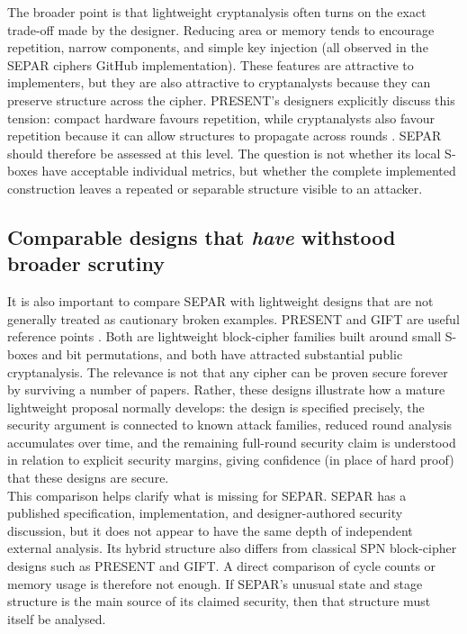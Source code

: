 \documentclass[11pt]{article}
\begin{document}
The broader point is that lightweight cryptanalysis often turns on the exact trade-off made by the designer. Reducing area or memory tends to encourage repetition, narrow components, and simple key injection (all observed in the SEPAR ciphers GitHub implementation). These features are attractive to implementers, but they are also attractive to cryptanalysts because they can preserve structure across the cipher. PRESENT's designers explicitly discuss this tension: compact hardware favours repetition, while cryptanalysts also favour repetition because it can allow structures to propagate across rounds \cite{Bogdanov2007}. SEPAR should therefore be assessed at this level. The question is not whether its local S-boxes have acceptable individual metrics, but whether the complete implemented construction leaves a repeated or separable structure visible to an attacker.

\subsection{Comparable designs that \textit{have} withstood broader scrutiny}

It is also important to compare SEPAR with lightweight designs that are not generally treated as cautionary broken examples. PRESENT and GIFT are useful reference points \cite{Bogdanov2007,Banik2017}. Both are lightweight block-cipher families built around small S-boxes and bit permutations, and both have attracted substantial public cryptanalysis. The relevance is not that any cipher can be proven secure forever by surviving a number of papers. Rather, these designs illustrate how a mature lightweight proposal normally develops: the design is specified precisely, the security argument is connected to known attack families, reduced round analysis accumulates over time, and the remaining full-round security claim is understood in relation to explicit security margins, giving confidence (in place of hard proof) that these designs are secure.\\

This comparison helps clarify what is missing for SEPAR. SEPAR has a published specification, implementation, and designer-authored security discussion, but it does not appear to have the same depth of independent external analysis. Its hybrid structure also differs from classical SPN block-cipher designs such as PRESENT and GIFT. A direct comparison of cycle counts or memory usage is therefore not enough. If SEPAR's unusual state and stage structure is the main source of its claimed security, then that structure must itself be analysed.
\end{document}

